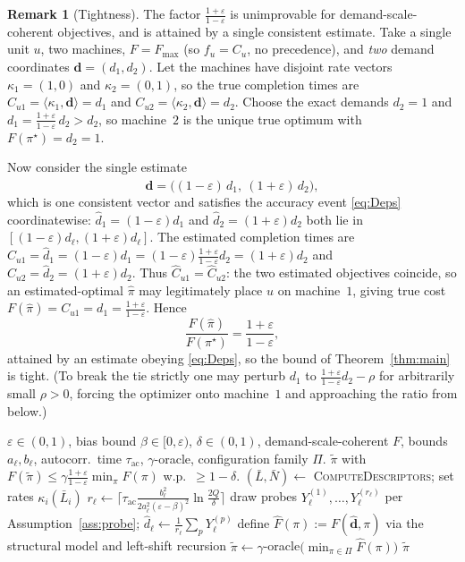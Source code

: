 \documentclass{amsart}
\theoremstyle{definition}
\newtheorem{remark}{Remark}
\begin{document}
\begin{remark}[Tightness]\label{rem:tight}
The factor $\frac{1+\varepsilon}{1-\varepsilon}$ is unimprovable for
demand-scale-coherent objectives, and is attained by a single consistent
estimate. Take a single unit $u$, two machines, $F=F_{\max}$ (so $f_u=C_u$, no
precedence), and \emph{two} demand coordinates $\mathbf d=(d_1,d_2)$. Let the
machines have disjoint rate vectors $\kappa_1=(1,0)$ and $\kappa_2=(0,1)$, so the
true completion times are $C_{u1}=\langle\kappa_1,\mathbf d\rangle=d_1$ and
$C_{u2}=\langle\kappa_2,\mathbf d\rangle=d_2$. Choose the exact demands
$d_2=1$ and $d_1=\frac{1+\varepsilon}{1-\varepsilon}\,d_2>d_2$, so machine~$2$ is
the unique true optimum with $F(\pi^\star)=d_2=1$.

Now consider the single estimate
\[
\widehat{\mathbf d}=\big((1-\varepsilon)\,d_1,\ (1+\varepsilon)\,d_2\big),
\]
which is one consistent vector and satisfies the accuracy event \eqref{eq:Deps}
coordinatewise: $\widehat d_1=(1-\varepsilon)d_1$ and
$\widehat d_2=(1+\varepsilon)d_2$ both lie in $[(1-\varepsilon)d_\ell,
(1+\varepsilon)d_\ell]$. The estimated completion times are
$\widehat C_{u1}=\widehat d_1=(1-\varepsilon)d_1
=(1-\varepsilon)\frac{1+\varepsilon}{1-\varepsilon}d_2=(1+\varepsilon)d_2$ and
$\widehat C_{u2}=\widehat d_2=(1+\varepsilon)d_2$. Thus
$\widehat C_{u1}=\widehat C_{u2}$: the two estimated objectives coincide, so an
estimated-optimal $\hat\pi$ may legitimately place $u$ on machine~$1$, giving
true cost $F(\hat\pi)=C_{u1}=d_1=\frac{1+\varepsilon}{1-\varepsilon}$. Hence
\[
\frac{F(\hat\pi)}{F(\pi^\star)}=\frac{1+\varepsilon}{1-\varepsilon},
\]
attained by an estimate obeying \eqref{eq:Deps}, so the bound of
Theorem~\ref{thm:main} is tight. (To break the tie strictly one may perturb
$d_1$ to $\frac{1+\varepsilon}{1-\varepsilon}d_2-\rho$ for arbitrarily small
$\rho>0$, forcing the optimizer onto machine~$1$ and approaching the ratio from
below.)
\end{remark}

\begin{algorithm}[h]
\caption{EstimatedOptimalMapping}\label{alg:map}
\begin{algorithmic}[1]
\Require $\varepsilon\in(0,1)$, bias bound $\beta\in[0,\varepsilon)$, $\delta\in(0,1)$, demand-scale-coherent $F$, bounds $a_\ell,b_\ell$, autocorr.\ time $\tau_{\mathrm{ac}}$, $\gamma$-oracle, configuration family $\Pi$.
\Ensure $\tilde\pi$ with $F(\tilde\pi)\le\gamma\frac{1+\varepsilon}{1-\varepsilon}\min_\pi F(\pi)$ w.p.\ $\ge1-\delta$.
\State $(\bar L,\bar N)\gets$ \textsc{ComputeDescriptors}; set rates $\kappa_i(\bar L_i)$
  \State $r_\ell\gets\big\lceil \tau_{\mathrm{ac}}\frac{b_\ell^2}{2a_\ell^2(\varepsilon-\beta)^2}\ln\frac{2Q}{\delta}\big\rceil$
  \State draw probes $Y^{(1)}_\ell,\dots,Y^{(r_\ell)}_\ell$ per Assumption~\ref{ass:probe}; $\widehat d_\ell\gets\frac1{r_\ell}\sum_p Y^{(p)}_\ell$
\EndFor
\State define $\widehat F(\pi):=F(\widehat{\mathbf d},\pi)$ via the structural model and left-shift recursion
\State $\tilde\pi\gets\gamma$-oracle$\big(\min_{\pi\in\Pi}\widehat F(\pi)\big)$
\State \Return $\tilde\pi$
\end{algorithmic}
\end{algorithm}
\end{document}
